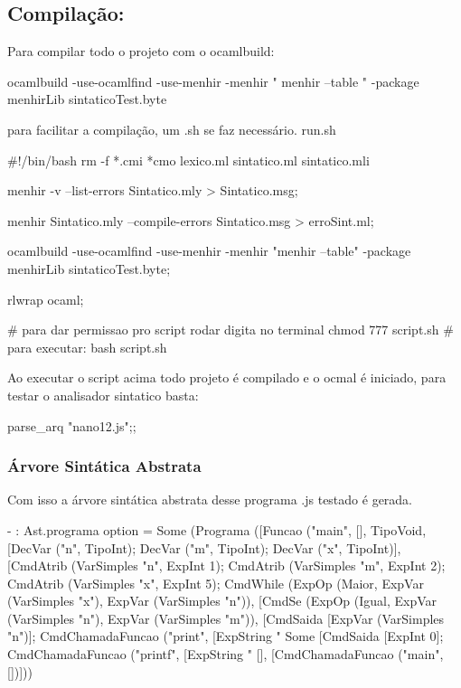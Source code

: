 \documentclass[12pt,a4paper,twoside]{article}
\begin{document}
\subsection{Compilação: }
Para compilar todo o projeto com o ocamlbuild:
\begin{terminal}
ocamlbuild -use-ocamlfind -use-menhir -menhir " menhir --table " -package menhirLib sintaticoTest.byte
\end{terminal}
para facilitar a compilação, um .sh se faz necessário.\newline
run.sh
\begin{terminal}
#!/bin/bash
rm -f *.cmi *cmo lexico.ml sintatico.ml sintatico.mli

menhir -v --list-errors Sintatico.mly > Sintatico.msg;

menhir Sintatico.mly --compile-errors Sintatico.msg > erroSint.ml;

ocamlbuild -use-ocamlfind -use-menhir -menhir "menhir --table" -package menhirLib sintaticoTest.byte;

rlwrap ocaml;

# para dar permissao pro script rodar digita no terminal chmod 777 script.sh
# para executar: bash script.sh
\end{terminal}
Ao executar o script acima todo projeto é compilado e o ocmal é iniciado, para testar o analisador sintatico basta:
\begin{terminal}
parse_arq "nano12.js";;
\end{terminal}

\subsubsection{Árvore Sintática Abstrata}
Com isso a árvore sintática abstrata desse programa .js testado é gerada.

\begin{terminal}
- : Ast.programa option =
Some
 (Programa
   ([Funcao ("main", [], TipoVoid,
      [DecVar ("n", TipoInt); DecVar ("m", TipoInt); DecVar ("x", TipoInt)],
      [CmdAtrib (VarSimples "n", ExpInt 1);
       CmdAtrib (VarSimples "m", ExpInt 2);
       CmdAtrib (VarSimples "x", ExpInt 5);
       CmdWhile
        (ExpOp (Maior, ExpVar (VarSimples "x"), ExpVar (VarSimples "n")),
        [CmdSe
          (ExpOp (Igual, ExpVar (VarSimples "n"), ExpVar (VarSimples "m")),
          [CmdSaida [ExpVar (VarSimples "n")];
           CmdChamadaFuncao ("print",
            [ExpString "%
          Some
           [CmdSaida [ExpInt 0];
            CmdChamadaFuncao ("printf",
             [ExpString "%
   [], [CmdChamadaFuncao ("main", [])]))
\end{terminal}
\end{document}
